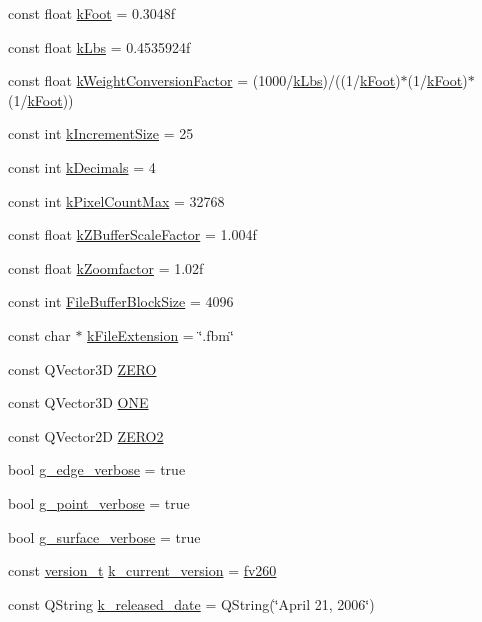 \begin{DoxyCompactItemize}
\item 
const float \hyperlink{namespaceShipCAD_a8c1484188fed1e735c5a94f64a6817ab}{k\+Foot} = 0.\+3048f
\item 
const float \hyperlink{namespaceShipCAD_ad6937518d9742e268b279000d1e7a509}{k\+Lbs} = 0.\+4535924f
\item 
const float \hyperlink{namespaceShipCAD_aa4319c8e7adfa68048f95c1614984036}{k\+Weight\+Conversion\+Factor} = (1000/\hyperlink{namespaceShipCAD_ad6937518d9742e268b279000d1e7a509}{k\+Lbs})/((1/\hyperlink{namespaceShipCAD_a8c1484188fed1e735c5a94f64a6817ab}{k\+Foot})$\ast$(1/\hyperlink{namespaceShipCAD_a8c1484188fed1e735c5a94f64a6817ab}{k\+Foot})$\ast$(1/\hyperlink{namespaceShipCAD_a8c1484188fed1e735c5a94f64a6817ab}{k\+Foot}))
\item 
const int \hyperlink{namespaceShipCAD_a1c0de7dc4306d7908bd8c6f7ff69ecdc}{k\+Increment\+Size} = 25
\item 
const int \hyperlink{namespaceShipCAD_ac88ffd27e117a3e612997a36a5d4616d}{k\+Decimals} = 4
\item 
const int \hyperlink{namespaceShipCAD_ac8176e9d12f859826fb131b7febb8c8a}{k\+Pixel\+Count\+Max} = 32768
\item 
const float \hyperlink{namespaceShipCAD_a519c591e5f5e3f60603b3133a4a2094e}{k\+Z\+Buffer\+Scale\+Factor} = 1.\+004f
\item 
const float \hyperlink{namespaceShipCAD_a80babe3fef93f1117e1c410f8d3c22c2}{k\+Zoomfactor} = 1.\+02f
\item 
const int \hyperlink{namespaceShipCAD_afeba968c9abef53c8d1ff63855076dec}{File\+Buffer\+Block\+Size} = 4096
\item 
const char $\ast$ \hyperlink{namespaceShipCAD_a6461e4d91e555f0c732b53f8998b325d}{k\+File\+Extension} = \char`\"{}.fbm\char`\"{}
\item 
const Q\+Vector3D \hyperlink{namespaceShipCAD_a949bc53a1634b268b43de672807480fb}{Z\+E\+RO}
\item 
const Q\+Vector3D \hyperlink{namespaceShipCAD_ad454d484187a50b115d2e77055617816}{O\+NE}
\item 
const Q\+Vector2D \hyperlink{namespaceShipCAD_ab47218dccdf4c94d5989b2e5b13d8603}{Z\+E\+R\+O2}
\item 
bool \hyperlink{namespaceShipCAD_ad5a157bd082e37a863f05b7c54a1d7cc}{g\+\_\+edge\+\_\+verbose} = true
\item 
bool \hyperlink{namespaceShipCAD_ae059a88fbc18c56ceee2fd1cd7f2aad0}{g\+\_\+point\+\_\+verbose} = true
\item 
bool \hyperlink{namespaceShipCAD_a45538d3cd2c9293bf0bd4b09a23670ac}{g\+\_\+surface\+\_\+verbose} = true
\item 
const \hyperlink{namespaceShipCAD_af3a6fa23a7318acbda7b0066b53d694f}{version\+\_\+t} \hyperlink{namespaceShipCAD_aa3415e1acf9bdb19e24f31f5138d6a60}{k\+\_\+current\+\_\+version} = \hyperlink{namespaceShipCAD_af3a6fa23a7318acbda7b0066b53d694fa3e815680f28b362a51b70712e376e7d7}{fv260}
\item 
const Q\+String \hyperlink{namespaceShipCAD_a833fc6d39d2f0fd7fa31d0a691b0b726}{k\+\_\+released\+\_\+date} = Q\+String(\char`\"{}April 21, 2006\char`\"{})
\end{DoxyCompactItemize}


